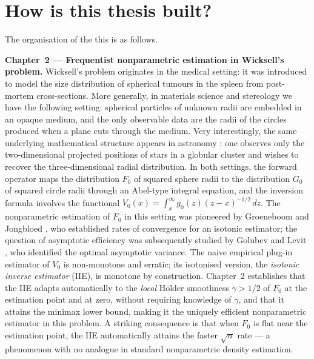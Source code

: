 \section{How is this thesis built?}\label{par: outline}
The organisation of the this is as follows.

\medskip
\noindent\textbf{Chapter~2 --- Frequentist nonparametric estimation in Wicksell's problem.}
Wicksell's problem originates in the medical setting: it was introduced to model the size distribution of spherical tumours in the spleen from post-mortem cross-sections. More generally, in materials science and stereology \cite{14} we have the following setting: spherical particles of unknown radii are embedded in an opaque medium, and the only observable data are the radii of the circles produced when a plane cuts through the medium. Very interestingly, the same underlying mathematical structure appears in astronomy \cite{33, 19}: one observes only the two-dimensional projected positions of stars in a globular cluster and wishes to recover the three-dimensional radial distribution. In both settings, the forward operator maps the distribution $F_0$ of squared sphere radii to the distribution $G_0$ of squared circle radii through an Abel-type integral equation, and the inversion formula involves the functional $V_0(x) = \int_x^\infty g_0(z)(z-x)^{-1/2}\,dz$. The nonparametric estimation of $F_0$ in this setting was pioneered by Groeneboom and Jongbloed \cite{1}, who established rates of convergence for an isotonic estimator; the question of asymptotic efficiency was subsequently studied by Golubev and Levit \cite{10}, who identified the optimal asymptotic variance. The naive empirical plug-in estimator of $V_0$ is non-monotone and erratic; its isotonised version, the \textit{isotonic inverse estimator} (IIE), is monotone by construction. Chapter~2 establishes that the IIE adapts automatically to the \textit{local} H\"{o}lder smoothness $\gamma > 1/2$ of $F_0$ at the estimation point and at zero, without requiring knowledge of $\gamma$, and that it attains the minimax lower bound, making it the uniquely efficient nonparametric estimator in this problem. A striking consequence is that when $F_0$ is flat near the estimation point, the IIE automatically attains the faster $\sqrt{n}$ rate --- a phenomenon with no analogue in standard nonparametric density estimation.

